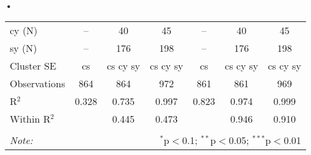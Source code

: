 \textbf{\textbf{•}}\documentclass[a4paper]{article}
\begin{document}
\begin{table}[h!]
{\begin{tabular}[t]{lcccccc}
cy (N) & -- & 40 & 45 & -- & 40 & 45\\
sy (N) & -- & 176 & 198 & -- & 176 & 198\\
\midrule
Cluster SE & cs & cs cy sy & cs cy sy & cs & cs cy sy & cs cy sy\\
Observations & 864&864&972&861&861&969\\
R$^2$ & 0.328 & 0.735 & 0.997 & 0.823 &0.974 & 0.999 \\
Within R$^2$ & & 0.445 & 0.473 & & 0.946 & 0.910 \\ \bottomrule \\[-1em]
\textit{Note:}  & \multicolumn{6}{r}{$^{*}$p$<$0.1; $^{**}$p$<$0.05; $^{***}$p$<$0.01} \\ 
\end{tabular}
}
\end{table}
\FloatBarrier
\end{document}

